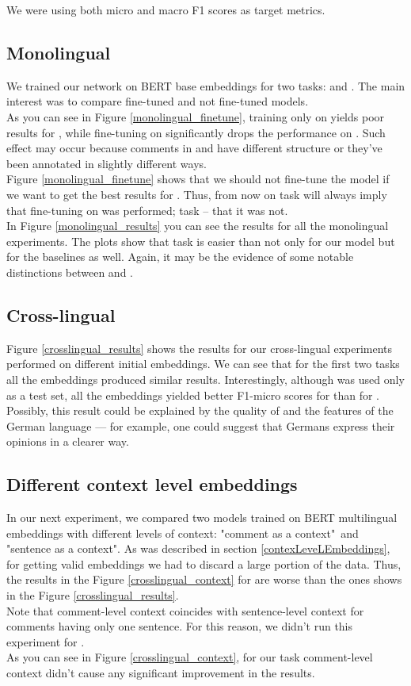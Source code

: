 We were using both micro and macro F1 scores as target metrics.
\subsection{Monolingual}
We trained our network on BERT base embeddings for two tasks: \taskEN and \taskORG. The main interest was to compare fine-tuned and not fine-tuned models. \\ 

As you can see in Figure \ref{monolingual_finetune}, training only on \dataEN yields poor results for \dataORG, while fine-tuning on \dataORG significantly drops the performance on \dataEN. Such effect may occur because comments in \dataEN and \dataORG have different structure or they've been annotated in slightly different ways. \\
Figure \ref{monolingual_finetune} shows that we should not fine-tune the model if we want to get the best results for \dataEN. Thus, from now on task \taskORG will always imply that fine-tuning on \dataORG was performed; task \taskEN -- that it was not. \\

In Figure \ref{monolingual_results} you can see the results for all the monolingual experiments. The plots show that task \taskORGORG is easier than \taskORG not only for our model but for the baselines as well. Again, it may be the evidence of some notable distinctions between \dataEN and \dataORG.
\subsection{Cross-lingual}
Figure \ref{crosslingual_results} shows the results for our cross-lingual experiments performed on different initial embeddings. We can see that for the first two tasks all the embeddings produced similar results. Interestingly, although \dataEN was used only as a test set, all the embeddings yielded better F1-micro scores for \taskDE than for \taskEN. Possibly, this result could be explained by the quality of \taskDE and the features of the German language --- for example, one could suggest that Germans express their opinions in a clearer way.

\subsection{Different context level embeddings}
In our next experiment, we compared two models trained on BERT multilingual embeddings with different levels of context: "comment as a context"\ and "sentence as a context". As was described in section \ref{contexLeveLEmbeddings}, for getting valid embeddings we had to discard a large portion of the data. Thus, the results in the Figure \ref{crosslingual_context} for \dataEN are worse than the ones shows in the Figure \ref{crosslingual_results}. \\
Note that comment-level context coincides with sentence-level context for comments having only one sentence. For this reason, we didn't run this experiment for \dataORG. \\
As you can see in Figure \ref{crosslingual_context}, for our task comment-level context didn't cause any significant improvement in the results.

